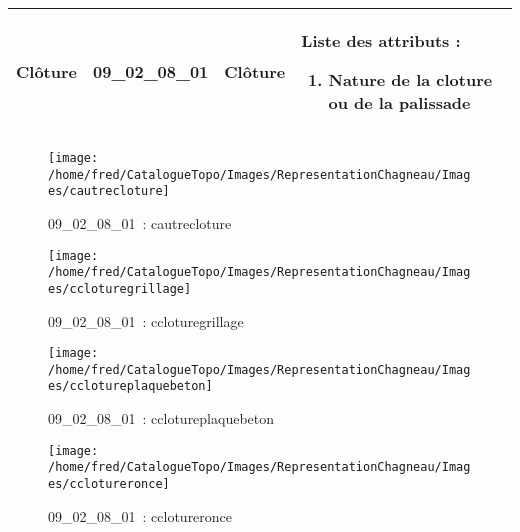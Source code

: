 \documentclass[12pt,titlepage]{book}
\begin{document}
\renewcommand{\arraystretch}{1.2}
\begin{supertabular}{|p{10cm}|c|p{13cm}|p{12cm}|}
 Clôture & 09\_02\_08\_01 & Clôture & Liste des attributs :
\begin{enumerate}
  \item Nature de la cloture ou de la palissade\end{enumerate}
\\
\hline
\end{supertabular}
\begin{figure}[h!]
  \hfill         %
  \begin{minipage}[t]{3cm}
    \begin{center}
      \texttt{[image: /home/fred/CatalogueTopo/Images/RepresentationChagneau/Images/cautrecloture]}
      \caption[~09\_02\_08\_01]{\small{09\_02\_08\_01~:} \tiny{cautrecloture}}\label{cautrecloture}
    \end{center}
  \end{minipage}
  \begin{minipage}[t]{3cm}
    \begin{center}
      \texttt{[image: /home/fred/CatalogueTopo/Images/RepresentationChagneau/Images/ccloturegrillage]}
      \caption[~09\_02\_08\_01]{\small{09\_02\_08\_01~:} \tiny{ccloturegrillage}}\label{ccloturegrillage}
    \end{center}
  \end{minipage}
  \begin{minipage}[t]{3cm}
    \begin{center}
      \texttt{[image: /home/fred/CatalogueTopo/Images/RepresentationChagneau/Images/cclotureplaquebeton]}
      \caption[~09\_02\_08\_01]{\small{09\_02\_08\_01~:} \tiny{cclotureplaquebeton}}\label{cclotureplaquebeton}
    \end{center}
  \end{minipage}
  \begin{minipage}[t]{3cm}
    \begin{center}
      \texttt{[image: /home/fred/CatalogueTopo/Images/RepresentationChagneau/Images/cclotureronce]}
      \caption[~09\_02\_08\_01]{\small{09\_02\_08\_01~:} \tiny{cclotureronce}}\label{cclotureronce}
    \end{center}
  \end{minipage}

\end{figure}
\end{document}
